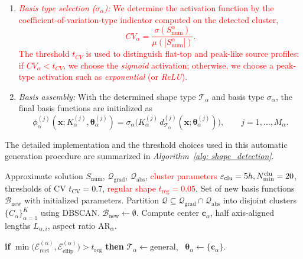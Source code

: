 \documentclass{article}
\newcommand{\red}[1]{\textcolor{red}{#1}}
\theoremstyle{plain}
\theoremstyle{definition}
\begin{document}
{\begin{enumerate}
      \item \red{\emph{Basis type selection ($\sigma_\alpha$):}
      We determine the activation function by the coefficient-of-variation-type indicator computed on the detected cluster,
      \[
      CV_\alpha=\frac{\sigma(S_{\text{num}}^\alpha)}{\mu(|S_{\text{num}}^\alpha|)}.
      \]
      The threshold $t_{CV}$ is used to distinguish flat-top and peak-like source profiles: if $CV_\alpha<t_{CV}$, we choose the \emph{sigmoid} activation; otherwise, we choose a peak-type activation such as \emph{exponential} (or \emph{ReLU}).}

      \item \emph{Basis assembly:}
      With the determined shape type $\mathcal{T}_\alpha$ and basis type $\sigma_\alpha$, the final basis functions are initialized as
      \[
      \phi_\alpha^{(j)}(\boldsymbol{x};K_\alpha^{(j)},\boldsymbol{\theta}_\alpha^{(j)})
      =
      \sigma_{\alpha}\bigl(
      K_\alpha^{(j)}\, d_{\mathcal{T}_\alpha}^{(j)}(\boldsymbol{x};\boldsymbol{\theta}_\alpha^{(j)})
      \bigr),
      \qquad j=1,\dots,M_\alpha.
      \]
  \end{enumerate}
  The detailed implementation and the threshold choices used in this automatic generation procedure are summarized in \emph{Algorithm~\ref{alg: shape_detection}}.


\begin{algorithm}[H]
\caption{Shape detection and basis initialization}
\label{alg: shape_detection}
\begin{algorithmic}[1]
\REQUIRE  Approximate solution $S_{\text{num}}$, $\mathcal{Q}_{\text{grad}}$, $\mathcal{Q}_{\text{abs}}$, \red{cluster parameters $\varepsilon_{\rm clu}=5h, N_{\min}^{\rm clu}=20$}, thresholds of CV  $t_{\text{CV}} = 0.7$, \red{regular shape $t_{\text{reg}}=0.05$}.
\ENSURE Set of new basis functions $\mathcal{B}_{\text{new}}$ with initialized parameters.
\STATE Partition $\mathcal{Q}\subseteq \mathcal{Q}_{\text{grad}}\cap \mathcal{Q}_{\text{abs}}$ into disjoint clusters $\{C_\alpha\}_{\alpha=1}^K$ using DBSCAN. $\mathcal{B}_{\text{new}} \gets \emptyset$.
    \STATE Compute center $\boldsymbol{c}_\alpha$, half axis-aligned lengths $L_{\alpha,i}$, aspect ratio $\text{AR}_\alpha$.
    
    \STATE \textbf{if} $\min \bigl(\mathcal{E}_{\mathrm{rect}}^{(\alpha)},\mathcal{E}_{\mathrm{ellip}}^{(\alpha)}\bigr) > t_{\mathrm{reg}}$ \textbf{then} $\mathcal{T}_\alpha \gets \text{general}$, \ $\boldsymbol{\theta}_\alpha \gets \{\boldsymbol{c}_\alpha\}$.
    

\end{algorithmic}
\end{algorithm}}
\end{document}
